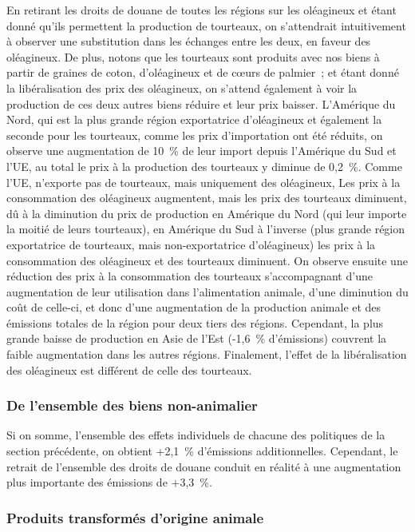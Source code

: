En retirant les droits de douane de toutes les régions sur les oléagineux et étant donné qu'ils permettent la production de tourteaux, on s'attendrait intuitivement à observer une substitution dans les échanges entre les deux, en faveur des oléagineux. De plus, notons que les tourteaux sont produits avec nos biens à partir de graines de coton, d'oléagineux et de cœurs de palmier~; et étant donné la libéralisation des prix des oléagineux, on s'attend également à voir la production de ces deux autres biens réduire et leur prix baisser. L'Amérique du Nord, qui est la plus grande région exportatrice d'oléagineux et également la seconde pour les tourteaux, comme les prix d'importation ont été réduits, on observe une augmentation de 10~\% de leur import depuis l'Amérique du Sud et l'UE, au total le prix à la production des tourteaux y diminue de 0,2~\%. Comme l'UE, n'exporte pas de tourteaux, mais uniquement des oléagineux, Les prix à la consommation des oléagineux augmentent, mais les prix des tourteaux diminuent, dû à la diminution du prix de production en Amérique du Nord (qui leur importe la moitié de leurs tourteaux), en Amérique du Sud à l'inverse (plus grande région exportatrice de tourteaux, mais non-exportatrice d'oléagineux) les prix à la consommation des oléagineux et des tourteaux diminuent. On observe ensuite une réduction des prix à la consommation des tourteaux s'accompagnant d'une augmentation de leur utilisation dans l'alimentation animale, d'une diminution du coût de celle-ci, et donc d'une augmentation de la production animale et des émissions totales de la région pour deux tiers des régions. Cependant, la plus grande baisse de production en Asie de l'Est (-1,6~\% d'émissions) couvrent la faible augmentation dans les autres régions. Finalement, l'effet de la libéralisation des oléagineux est différent de celle des tourteaux.


\subsubsection{De l'ensemble des biens non-animalier}\label{sousec_all_non_kl}

Si on somme, l'ensemble des effets individuels de chacune des politiques de la section précédente, on obtient +2,1~\% d'émissions additionnelles. Cependant, le retrait de l'ensemble des droits de douane conduit en réalité à une augmentation plus importante des émissions de +3,3~\%.


\subsubsection{Produits transformés d'origine animale}

